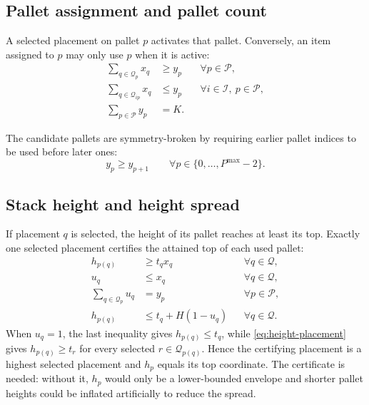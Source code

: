 \documentclass[11pt]{article}
\newcommand{\Item}{\mathcal{I}}
\newcommand{\Pallet}{\mathcal{P}}
\newcommand{\Place}{\mathcal{Q}}
\begin{document}
\subsection{Pallet assignment and pallet count}

A selected placement on pallet $p$ activates that pallet.  Conversely, an item
assigned to $p$ may only use $p$ when it is active:
\begin{align}
  \sum_{q\in\Place_p}x_q &\ge y_p && \forall p\in\Pallet, \\
  \sum_{q\in\Place_{ip}}x_q &\le y_p && \forall i\in\Item,\ p\in\Pallet, \\
  \sum_{p\in\Pallet}y_p &= K. &&
  \label{eq:pallet-assignment}
\end{align}

The candidate pallets are symmetry-broken by requiring earlier pallet indices
to be used before later ones:
\begin{equation}
  y_p\ge y_{p+1}
  \qquad \forall p\in\{0,\ldots,P^{\max}-2\}.
  \label{eq:pallet-order}
\end{equation}

\subsection{Stack height and height spread}

If placement $q$ is selected, the height of its pallet reaches at least its
top.  Exactly one selected placement certifies the attained top of each used
pallet:
\begin{align}
  h_{p(q)} &\ge t_q x_q && \forall q\in\Place,\label{eq:height-placement}\\
  u_q &\le x_q && \forall q\in\Place,\label{eq:top-selected}\\
  \sum_{q\in\Place_p}u_q &=y_p && \forall p\in\Pallet,\label{eq:one-top-certificate}\\
  h_{p(q)} &\le t_q+H(1-u_q) && \forall q\in\Place.
  \label{eq:top-attainment}
\end{align}
When $u_q=1$, the last inequality gives $h_{p(q)}\le t_q$, while
\eqref{eq:height-placement} gives $h_{p(q)}\ge t_r$ for every selected
$r\in\Place_{p(q)}$.  Hence the certifying placement is a highest selected
placement and $h_p$ equals its top coordinate.  The certificate is needed:
without it, $h_p$ would only be a lower-bounded envelope and shorter pallet
heights could be inflated artificially to reduce the spread.
\end{document}
